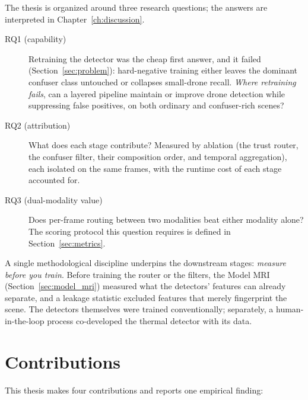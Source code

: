 The thesis is organized around three research questions; the answers are interpreted in Chapter~\ref{ch:discussion}.

\begin{description}
    \item[RQ1 (capability)] Retraining the detector was the cheap first answer, and it failed (Section~\ref{sec:problem}): hard-negative training either leaves the dominant confuser class untouched or collapses small-drone recall. \emph{Where retraining fails}, can a layered pipeline maintain or improve drone detection while suppressing false positives, on both ordinary and confuser-rich scenes?
    \item[RQ2 (attribution)] What does each stage contribute? Measured by ablation (the trust router, the confuser filter, their composition order, and temporal aggregation), each isolated on the same frames, with the runtime cost of each stage accounted for.
    \item[RQ3 (dual-modality value)] Does per-frame routing between two modalities beat either modality alone? The scoring protocol this question requires is defined in Section~\ref{sec:metrics}.
\end{description}

A single methodological discipline underpins the downstream stages: \emph{measure before you train}. Before training the router or the filters, the Model MRI (Section~\ref{sec:model_mri}) measured what the detectors' features can already separate, and a leakage statistic excluded features that merely fingerprint the scene. The detectors themselves were trained conventionally; separately, a human-in-the-loop process co-developed the thermal detector with its data.

\section{Contributions}

This thesis makes four contributions and reports one empirical finding:

